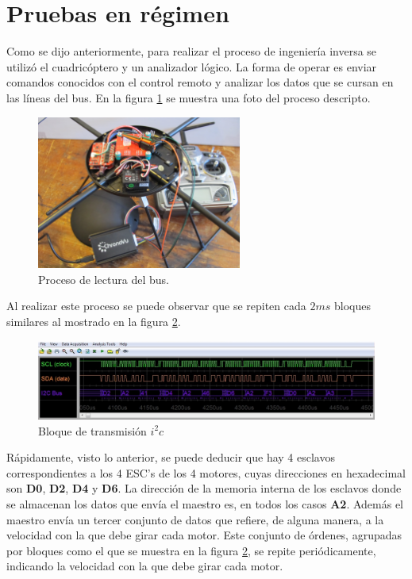 \documentclass[main]{subfiles}
\begin{document}
\newpage
\section{Pruebas en régimen}

Como se dijo anteriormente, para realizar el proceso de ingeniería inversa se utilizó el cuadricóptero y un analizador lógico. La forma de operar es enviar comandos conocidos con el control remoto y analizar los datos que se cursan en las líneas del bus. En la figura \ref{fig:sniffing} se muestra una foto del proceso descripto.

\begin{figure}[h!]
	\centering
	\includegraphics[width=0.6\textwidth]{./pics_sniffer/sniffing.jpg}
	\caption{Proceso de lectura del bus.}
	\label{fig:sniffing}
\end{figure}

Al realizar este proceso se puede observar que se repiten cada $2ms$ bloques similares al mostrado en la figura \ref{fig:bloque_snif}.

\begin{figure}[h!]
	\centering
	\includegraphics[width=1\textwidth]{./pics_sniffer/bloque_snif.jpg}
	\caption{Bloque de transmisión $i^2c$}
	\label{fig:bloque_snif}
\end{figure}

Rápidamente, visto lo anterior, se puede deducir que hay 4 esclavos correspondientes a los 4 ESC's de los 4 motores, cuyas direcciones en hexadecimal son \textbf{D0}, \textbf{D2}, \textbf{D4} y \textbf{D6}. La dirección de la memoria interna de los esclavos donde se almacenan los datos que envía el maestro es, en todos los casos \textbf{A2}. Además el maestro envía un tercer conjunto de datos que refiere, de alguna manera, a la velocidad con la que debe girar cada motor.
Este conjunto de órdenes, agrupadas por bloques como el que se muestra en la figura \ref{fig:bloque_snif}, se repite periódicamente, indicando la velocidad con la que debe girar cada motor.\\
\end{document}

